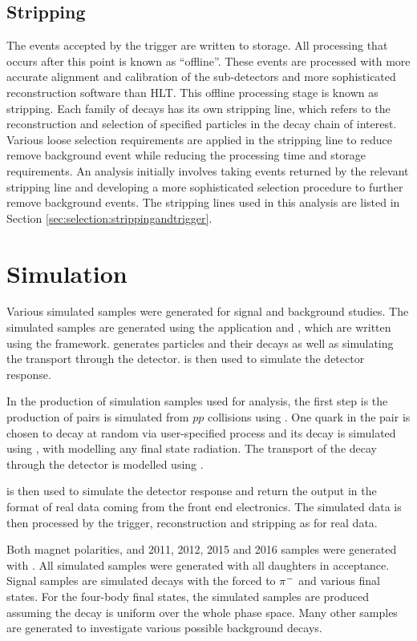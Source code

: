 \subsection{Stripping}

The events accepted by the trigger are written to storage. All processing that occurs after this point is known as ``offline''. These events are processed with more accurate alignment and calibration of the sub-detectors and more sophisticated reconstruction software than HLT. This offline processing stage is known as stripping. Each family of decays has its own stripping line, which refers to the reconstruction and selection of specified particles in the decay chain of interest. Various loose selection requirements are applied in the stripping line to reduce remove background event while reducing the processing time and storage requirements. An analysis initially involves taking events returned by the relevant stripping line and developing a more sophisticated selection procedure to further remove background events. The stripping lines used in this analysis are listed in Section \ref{sec:selection:strippingandtrigger}.

\section{Simulation}

Various simulated samples were generated for signal and background studies. The simulated samples are generated using the \lhcb application \gauss and \boole, which are written using the \gaudi framework. \gauss generates particles and their decays as well as simulating the transport through the detector. \boole is then used to simulate the detector response. 

In the production of simulation samples used for analysis, the first step is the production of \bquark\bquarkbar pairs is simulated from $pp$ collisions using \pythia. One quark in the \bquark\bquarkbar pair is chosen to decay at random via user-specified process and its decay is simulated using \evtgen, with \photos modelling any final state radiation. The transport of the decay through the detector is modelled using \geant. 

\boole is then used to simulate the detector response and return the output in the format of real data coming from the front end electronics. The simulated data is then processed by the trigger, reconstruction and stripping as for real data.

Both magnet polarities, and 2011, 2012, 2015 and 2016 samples were generated with . All simulated samples were generated with all daughters in \lhcb acceptance. Signal samples are simulated \btodkst decays with the \Kstarm forced to \KS${{\pi}^-}$ and various \D final states. For the four-body \D final states, the simulated samples are produced assuming the \D decay is uniform over the whole phase space. Many other samples are generated to investigate various possible background decays.
